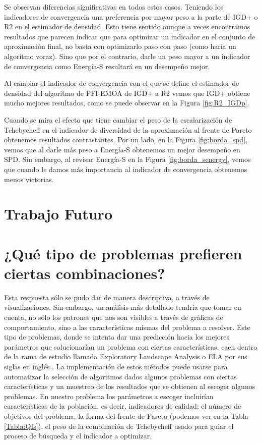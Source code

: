 Se observan diferencias significativas en todos estos casos. Teniendo los indicadores de convergencia una preferencia por mayor peso a la parte de IGD+ o R2 en el estimador de densidad. Esto tiene sentido aunque a veces encontramos resultados que parecen indicar que para optimizar un indicador en el conjunto de aproximación final, no basta con optimizarlo paso con paso (como haría un algoritmo voraz). Sino que por el contrario, darle un peso mayor a un indicador de convergencia como Energía-S resultará en un desempeño mejor.

Al cambiar el indicador de convergencia con el que se define el estimador de densidad del algoritmo de PFI-EMOA \cite{PFI} de IGD+ a R2 vemos que IGD+ obtiene mucho mejores resultados, como se puede observar en la Figura \ref{fig:R2_IGDp}.

Cuando se mira el efecto que tiene cambiar el peso de la escalarización de Tchebycheff en el indicador de diversidad de la aproximación al frente de Pareto obtenemos resultados contrastantes. Por un lado, en la Figura \ref{fig:borda_spd}, vemos que al darle más peso a Energía-S obtenemos un mejor desempeño en SPD. Sin embargo, al revisar Energía-S en la Figura \ref{fig:borda_senergy}, vemos que cuando le damos más importancia al indicador de convergencia obtenemos menos victorias.

\section{Trabajo Futuro}
\section*{¿Qué tipo de problemas prefieren ciertas combinaciones?}
Esta respuesta sólo se pudo dar de manera descriptiva, a través de visualizaciones. Sin embargo, un análisis más detallado tendría que tomar en cuenta, no sólo los patrones que nos son visibles a través de gráficas de comportamiento, sino a las características mismas del problema a resolver. Este tipo de problemas, donde se intenta dar una predicción hacia los mejores parámetros que solucionarían un problema con ciertas características, caen dentro de la rama de estudio llamada Exploratory Landscape Analysis o ELA por sus siglas en inglés \cite{trajanovExplainableLandscapeAnalysis2022}. La implementación de estos métodos puede usarse para automatizar la selección de algoritmos dados algunos problemas con ciertas características y un muestreo de los resultados que se obtienen al escoger algunos problemas. En nuestro problema los parámetros a escoger incluirían características de la población, es decir, indicadores de calidad; el número de objetivos del problema, la forma del frente de Pareto (podemos ver en la Tabla \ref{Tabla:QIs}), el peso de la combinación de Tchebycheff usado para guiar el proceso de búsqueda y el indicador a optimizar. 

